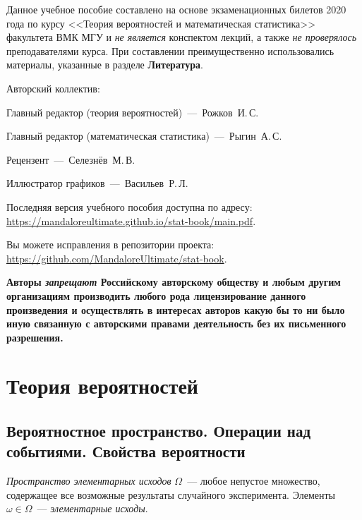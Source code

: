 






\newpage
Данное учебное пособие составлено на основе экзаменационных билетов 2020 года по курсу <<Теория вероятностей и математическая статистика>> факультета ВМК МГУ и \textit{не является} конспектом лекций, а также \textit{не проверялось} преподавателями курса. При составлении преимущественно использовались материалы, указанные в разделе \textbf{Литература}.

\vspace{5mm}

Авторский коллектив:
\begin{compactlist}
    \item Главный редактор (теория вероятностей)~---~Рожков~И.\,С.
    \item Главный редактор (математическая статистика)~---~Рыгин~А.\,С.
    \item Рецензент~---~Селезнёв~М.\,В.
    \item Иллюстратор графиков~---~Васильев~Р.\,Л.
\end{compactlist}

\vspace{5mm}

Последняя версия учебного пособия доступна по адресу: \url{https://mandaloreultimate.github.io/stat-book/main.pdf}.

Вы можете исправления в репозитории проекта: \url{https://github.com/MandaloreUltimate/stat-book}.

\vspace{1cm}

\textbf{Авторы \textit{запрещают} Российскому авторскому обществу и любым другим организациям производить любого рода лицензирование данного произведения и осуществлять в интересах авторов какую бы то ни было иную связанную с авторскими правами деятельность без их письменного разрешения.}

\tableofcontents %

\chapter{Теория вероятностей}

\section{Вероятностное пространство. Операции над событиями. Свойства вероятности}
\begin{defn}
    {\it Пространство элементарных исходов} $\Omega$~--- любое непустое множество, содержащее все возможные результаты случайного эксперимента. Элементы $\omega \in \Omega$~--- {\it элементарные исходы}.
\end{defn}

